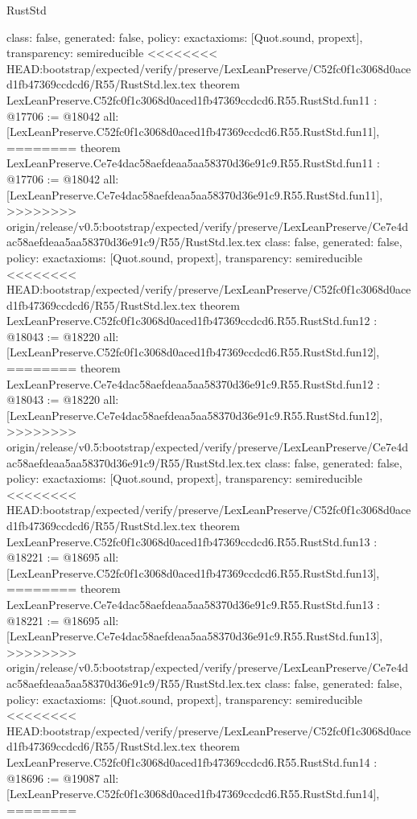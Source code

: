 \begin{lexlean}{RustStd}
\begin{coremodule}
{\begin{coremodule}
{{{{{{{{{{{{{{  class: false,
  generated: false,
  policy: exact{axioms: [Quot.sound, propext]},
  transparency: semireducible
}
<<<<<<<< HEAD:bootstrap/expected/verify/preserve/LexLeanPreserve/C52fc0f1c3068d0aced1fb47369ccdcd6/R55/RustStd.lex.tex
theorem LexLeanPreserve.C52fc0f1c3068d0aced1fb47369ccdcd6.R55.RustStd.fun11 : @17706 := @18042 {
  all: [LexLeanPreserve.C52fc0f1c3068d0aced1fb47369ccdcd6.R55.RustStd.fun11],
========
theorem LexLeanPreserve.Ce7e4dac58aefdeaa5aa58370d36e91c9.R55.RustStd.fun11 : @17706 := @18042 {
  all: [LexLeanPreserve.Ce7e4dac58aefdeaa5aa58370d36e91c9.R55.RustStd.fun11],
>>>>>>>> origin/release/v0.5:bootstrap/expected/verify/preserve/LexLeanPreserve/Ce7e4dac58aefdeaa5aa58370d36e91c9/R55/RustStd.lex.tex
  class: false,
  generated: false,
  policy: exact{axioms: [Quot.sound, propext]},
  transparency: semireducible
}
<<<<<<<< HEAD:bootstrap/expected/verify/preserve/LexLeanPreserve/C52fc0f1c3068d0aced1fb47369ccdcd6/R55/RustStd.lex.tex
theorem LexLeanPreserve.C52fc0f1c3068d0aced1fb47369ccdcd6.R55.RustStd.fun12 : @18043 := @18220 {
  all: [LexLeanPreserve.C52fc0f1c3068d0aced1fb47369ccdcd6.R55.RustStd.fun12],
========
theorem LexLeanPreserve.Ce7e4dac58aefdeaa5aa58370d36e91c9.R55.RustStd.fun12 : @18043 := @18220 {
  all: [LexLeanPreserve.Ce7e4dac58aefdeaa5aa58370d36e91c9.R55.RustStd.fun12],
>>>>>>>> origin/release/v0.5:bootstrap/expected/verify/preserve/LexLeanPreserve/Ce7e4dac58aefdeaa5aa58370d36e91c9/R55/RustStd.lex.tex
  class: false,
  generated: false,
  policy: exact{axioms: [Quot.sound, propext]},
  transparency: semireducible
}
<<<<<<<< HEAD:bootstrap/expected/verify/preserve/LexLeanPreserve/C52fc0f1c3068d0aced1fb47369ccdcd6/R55/RustStd.lex.tex
theorem LexLeanPreserve.C52fc0f1c3068d0aced1fb47369ccdcd6.R55.RustStd.fun13 : @18221 := @18695 {
  all: [LexLeanPreserve.C52fc0f1c3068d0aced1fb47369ccdcd6.R55.RustStd.fun13],
========
theorem LexLeanPreserve.Ce7e4dac58aefdeaa5aa58370d36e91c9.R55.RustStd.fun13 : @18221 := @18695 {
  all: [LexLeanPreserve.Ce7e4dac58aefdeaa5aa58370d36e91c9.R55.RustStd.fun13],
>>>>>>>> origin/release/v0.5:bootstrap/expected/verify/preserve/LexLeanPreserve/Ce7e4dac58aefdeaa5aa58370d36e91c9/R55/RustStd.lex.tex
  class: false,
  generated: false,
  policy: exact{axioms: [Quot.sound, propext]},
  transparency: semireducible
}
<<<<<<<< HEAD:bootstrap/expected/verify/preserve/LexLeanPreserve/C52fc0f1c3068d0aced1fb47369ccdcd6/R55/RustStd.lex.tex
theorem LexLeanPreserve.C52fc0f1c3068d0aced1fb47369ccdcd6.R55.RustStd.fun14 : @18696 := @19087 {
  all: [LexLeanPreserve.C52fc0f1c3068d0aced1fb47369ccdcd6.R55.RustStd.fun14],
========
}}}}}}}}}}}}}}}}}
\end{coremodule}}
\end{coremodule}
\end{lexlean}
